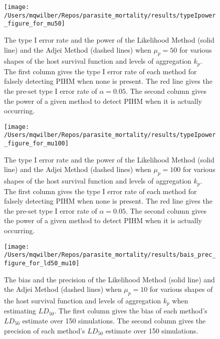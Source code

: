 \documentclass[12pt, a4paper]{article}
\begin{document}
\begin{figure}

    \texttt{[image: /Users/mqwilber/Repos/parasite\_mortality/results/typeIpower\_figure\_for\_mu50]}

    \caption{The type I error rate and the power of the Likelihood Method (solid line) and the Adjei Method (dashed lines) when $\mu_p = 50$ for various shapes of the host survival function and levels of aggregation $k_p$.  The first column gives the type I error rate of each method for falsely detecting PIHM when none is present.  The red line gives the the pre-set type I error rate of $\alpha = 0.05$.  The second column gives the power of a given method to detect PIHM when it is actually occurring. }
    \label{fig:typeI50}

\end{figure}

\begin{figure}

    \texttt{[image: /Users/mqwilber/Repos/parasite\_mortality/results/typeIpower\_figure\_for\_mu100]}

    \caption{The type I error rate and the power of the Likelihood Method (solid line) and the Adjei Method (dashed lines) when $\mu_p = 100$ for various shapes of the host survival function and levels of aggregation $k_p$.  The first column gives the type I error rate of each method for falsely detecting PIHM when none is present.  The red line gives the the pre-set type I error rate of $\alpha = 0.05$.  The second column gives the power of a given method to detect PIHM when it is actually occurring. }
    \label{fig:typeI100}

\end{figure}

\begin{figure}

    \texttt{[image: /Users/mqwilber/Repos/parasite\_mortality/results/bais\_prec\_figure\_for\_ld50\_mu10]}

    \caption{The bias and the precision of the Likelihood Method (solid line) and the Adjei Method (dashed lines) when $\mu_p = 10$ for various shapes of the host survival function and levels of aggregation $k_p$ when estimating $LD_{50}$.  The first column gives the bias of each method's $LD_{50}$ estimate over 150 simulations. The second column gives the precision of each method's $LD_{50}$ estimate over 150 simulations.}

    \label{fig:biasld50_10}

\end{figure}
\end{document}
